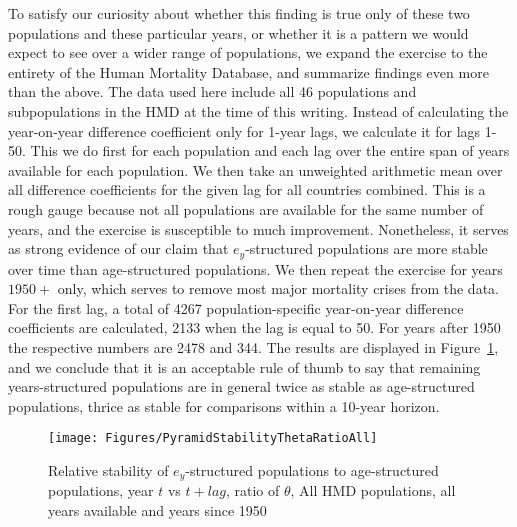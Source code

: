 To satisfy our curiosity about whether this finding is true only of these two
populations and these particular years, or whether it is a pattern we would
expect to see over a wider range of populations, we expand the exercise to the
entirety of the Human Mortality Database, and summarize findings even more than
the above. The data used here include all 46 populations and subpopulations
 in the HMD at the time of this writing. Instead of calculating the year-on-year
 difference coefficient only for 1-year lags, we calculate it for lags 1-50.
 This we do first for each population and each lag over the entire span of years
 available for each population. We then take an unweighted arithmetic mean over
 all difference coefficients for the given lag for all countries combined. This is a rough
 gauge because not all populations are available for the same number of years,
 and the exercise is susceptible to much improvement. Nonetheless, it serves as 
 strong evidence of our claim that
 $e_y$-structured populations are more stable over time than age-structured populations.
  We then repeat the exercise for years $1950+$ only, which serves to remove most 
  major mortality crises from the data. For the first
 lag, a total of 4267 population-specific year-on-year difference coefficients
 are calculated, 2133 when the lag is equal to 50. For years after 1950 the
 respective numbers are 2478 and 344. The results are displayed in
 Figure~\ref{fig:PyramidStabilityAll}, and we conclude that it is an acceptable
  rule of thumb to say that remaining
 years-structured populations are in general twice as stable as age-structured
 populations, thrice as stable for comparisons within a 10-year horizon.
 
\begin{figure}
      \centering
      \caption{Relative stability of $e_y$-structured populations to
                age-structured populations, year $t$ vs $t+lag$, ratio of
                $\theta$, All HMD populations, all years available and years
                since 1950}
         \texttt{[image: Figures/PyramidStabilityThetaRatioAll]}
      \label{fig:PyramidStabilityAll} 
\end{figure}

\FloatBarrier